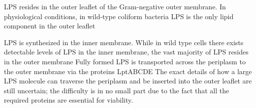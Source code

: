 \Ac{LPS} resides in the outer leaflet of the Gram-negative outer membrane. In physiological conditions, in wild-type coliform bacteria \ac{LPS} is the only lipid component in the
outer leaflet

\Ac{LPS} is synthesized in the inner membrane. While in wild type cells there exists detectable levels of \ac{LPS} in the inner membrane, the vast majority of \ac{LPS} resides in
the outer membrane Fully formed \ac{LPS} is transported across the periplasm to the outer membrane via the proteins
LptABCDE The exact details of how a large \ac{LPS} molecule can traverse the periplasm and be inserted into the
outer leaflet are still uncertain; the difficulty is in no small part due to the fact that all the required proteins are essential for viability.

